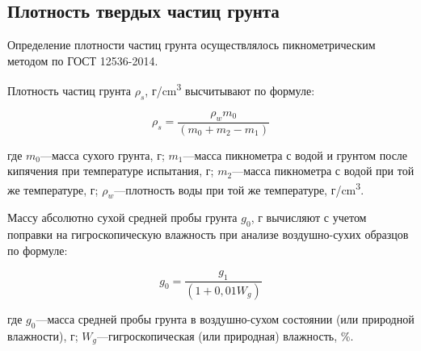 

\subsection{Плотность твердых частиц грунта}

Определение плотности частиц грунта осуществлялось пикнометрическим методом по 
ГОСТ 12536-2014. 
%
%
%
%
%

Плотность частиц грунта $\rho_s$, г/\si{\centi\meter^3} высчитывают по формуле:

\[
   \rho_s = \frac{\rho_w m_0}{(m_0+m_2-m_1)}
\]

где $m_0$---масса сухого грунта, г;
$m_1$---масса пикнометра с водой и грунтом после кипячения при
температуре испытания, г;
$m_2$---масса пикнометра с водой при той же температуре, г;
$\rho_w$---плотность воды при той же температуре, г/\si{\centi\meter^3}.

Массу абсолютно сухой средней пробы грунта $g_0$, г вычисляют с
учетом поправки на гигроскопическую влажность при анализе воздушно-сухих
образцов по формуле:

\[
   g_0 = \frac{g_1}{(1+0,01W_g)}
\]

где $g_0$---масса средней пробы грунта в воздушно-сухом состоянии (или
природной влажности), г;
$W_g$---гигроскопическая (или природная) влажность, \%.
